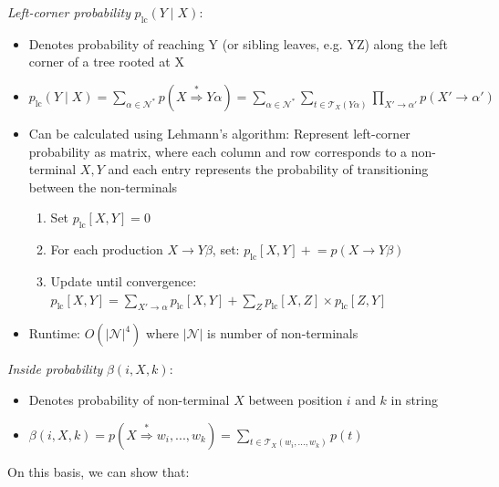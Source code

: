 \emph{Left-corner probability} $p_{\text{lc}}(Y \mid X)$:
\begin{itemize}
    \item Denotes probability of reaching Y (or sibling leaves, e.g. YZ) along the left corner of a tree rooted at X
    \item $p_{\text{lc}}(Y \mid X) = \sum_{\alpha \in \mathcal{N}^*} p(X \stackrel{*}{\Rightarrow} Y \alpha) = \sum_{\alpha \in \mathcal{N}^*} \sum_{t \in \mathcal{T}_X(Y\alpha)} \prod_{X' \to \alpha'} p(X' \to \alpha')$
    \item Can be calculated using Lehmann's algorithm: Represent left-corner probability as matrix, where each column and row corresponds to a non-terminal $X,Y$ and each entry represents the probability of transitioning between the non-terminals
    \begin{enumerate}
        \item Set $p_{\text{lc}}[X, Y] = 0$ 
        \item For each production $X \to Y \beta$, set: $p_{\text{lc}}[X, Y] \mathrel{+}= p(X \to Y \beta)$
        \item Update until convergence: $p_{\text{lc}}[X, Y] = \sum_{X' \to \alpha} p_{\text{lc}}[X, Y] + \sum_{Z} p_{\text{lc}}[X, Z] \times p_{\text{lc}}[Z, Y]$
    \end{enumerate}
    \item Runtime: $O(|\mathcal{N}|^4)$ where $|\mathcal{N}|$ is number of non-terminals
\end{itemize}
\emph{Inside probability} $\beta(i,X,k)$:
\begin{itemize}
    \item Denotes probability of non-terminal $X$ between position $i$ and $k$ in string
    \item $\beta(i,X,k) = p(X \stackrel{*}{\Rightarrow} w_i, ..., w_k) = \sum_{t \in \mathcal{T}_X(w_i, ..., w_k)} p(t)$
\end{itemize}
On this basis, we can show that:
